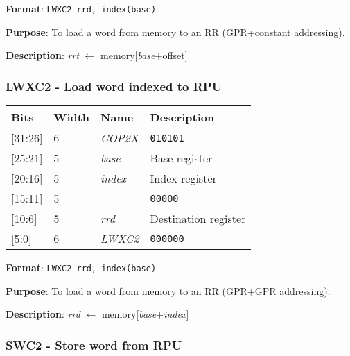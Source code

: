 \documentclass[11pt]{article}
\begin{document}
\textbf{Format}: \texttt{LWXC2 rrd, index(base)}

\textbf{Purpose}: To load a word from memory to an RR (GPR+constant addressing).

\textbf{Description}: \emph{rrt} $\leftarrow$ memory[\emph{base}+offset]

\text{}
\subsubsection{LWXC2 - Load word indexed to RPU}
\text{}

\begin{table}[H] \centering
  \def\arraystretch{1.4}
  \begin{tabular}{|m{2cm}|m{1.5cm}|m{2.5cm}|m{4.5cm}|}
    \hline
    \textbf{Bits} & \textbf{Width} & \textbf{Name} & \textbf{Description}\\ \hline

    [31:26] & 6 & \emph{COP2X} & \texttt{010101}\\ \hline

    [25:21] & 5 & \emph{base} & Base register\\ \hline

    [20:16] & 5 & \emph{index} & Index register\\ \hline

    [15:11] & 5 & & \texttt{00000}\\ \hline

    [10:6] & 5 & \emph{rrd} & Destination register\\ \hline

    [5:0] & 6 & \emph{LWXC2} & \texttt{000000}\\ \hline
  \end{tabular}
\end{table}

\textbf{Format}: \texttt{LWXC2 rrd, index(base)}

\textbf{Purpose}: To load a word from memory to an RR (GPR+GPR addressing).

\textbf{Description}: \emph{rrd} $\leftarrow$ memory[\emph{base}+\emph{index}]

\text{}
\subsubsection{SWC2 - Store word from RPU}
\text{}
\end{document}
